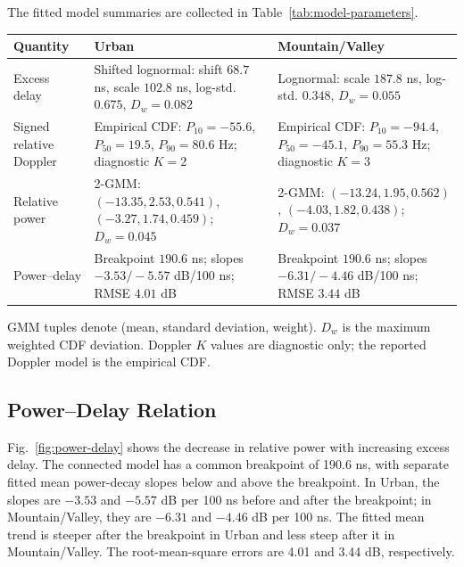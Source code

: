 \documentclass[conference]{IEEEtran}
\begin{document}
\begin{strip}
\noindent The fitted model summaries are collected in Table~\ref{tab:model-parameters}.
\par\vspace{1mm}
\centering
{}
\label{tab:model-parameters}
\scriptsize
\setlength{\tabcolsep}{3pt}
\begin{tabularx}{0.96\textwidth}{lXX}
\toprule
Quantity & Urban & Mountain/Valley\\
\midrule
Excess delay &
Shifted lognormal: shift $68.7$ ns, scale $102.8$ ns, log-std. $0.675$, $D_w=0.082$ &
Lognormal: scale $187.8$ ns, log-std. $0.348$, $D_w=0.055$\\
Signed relative Doppler &
Empirical CDF: $P_{10}=-55.6$, $P_{50}=19.5$, $P_{90}=80.6$ Hz; diagnostic $K=2$ &
Empirical CDF: $P_{10}=-94.4$, $P_{50}=-45.1$, $P_{90}=55.3$ Hz; diagnostic $K=3$\\
Relative power &
2-GMM: $(-13.35,2.53,0.541)$, $(-3.27,1.74,0.459)$; $D_w=0.045$ &
2-GMM: $(-13.24,1.95,0.562)$, $(-4.03,1.82,0.438)$; $D_w=0.037$\\
Power--delay &
Breakpoint $190.6$ ns; slopes $-3.53/-5.57$ dB/100 ns; RMSE $4.01$ dB &
Breakpoint $190.6$ ns; slopes $-6.31/-4.46$ dB/100 ns; RMSE $3.44$ dB\\
\bottomrule
\end{tabularx}
\vspace{-1mm}
\parbox{0.96\textwidth}{\scriptsize GMM tuples denote (mean, standard deviation, weight). $D_w$ is the maximum weighted CDF deviation. Doppler $K$ values are diagnostic only; the reported Doppler model is the empirical CDF.}
\end{strip}

\subsection{Power--Delay Relation}
Fig.~\ref{fig:power-delay} shows the decrease in relative power with increasing excess delay. The connected model has a common breakpoint of 190.6 ns, with separate fitted mean power-decay slopes below and above the breakpoint. In Urban, the slopes are $-3.53$ and $-5.57$ dB per 100 ns before and after the breakpoint; in Mountain/Valley, they are $-6.31$ and $-4.46$ dB per 100 ns. The fitted mean trend is steeper after the breakpoint in Urban and less steep after it in Mountain/Valley. The root-mean-square errors are 4.01 and 3.44 dB, respectively.
\end{document}
